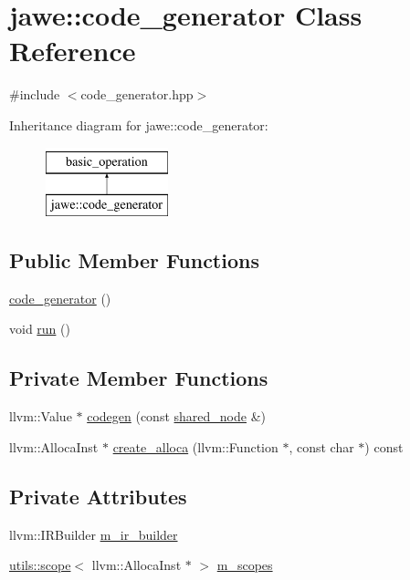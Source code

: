 \hypertarget{classjawe_1_1code__generator}{}\section{jawe\+:\+:code\+\_\+generator Class Reference}
\label{classjawe_1_1code__generator}


{\ttfamily \#include $<$code\+\_\+generator.\+hpp$>$}

Inheritance diagram for jawe\+:\+:code\+\_\+generator\+:\begin{figure}[H]
\begin{center}
\leavevmode
\includegraphics[height=2.000000cm]{classjawe_1_1code__generator}
\end{center}
\end{figure}
\subsection*{Public Member Functions}
\begin{DoxyCompactItemize}
\item 
\hyperlink{classjawe_1_1code__generator_a1218452973234e90972be154fc25bf92}{code\+\_\+generator} ()
\item 
void \hyperlink{classjawe_1_1code__generator_af280f3dcaeb6cbbf30b5e9eb55771b21}{run} ()
\end{DoxyCompactItemize}
\subsection*{Private Member Functions}
\begin{DoxyCompactItemize}
\item 
llvm\+::\+Value $\ast$ \hyperlink{classjawe_1_1code__generator_a88b1f6fff308ef1b6c3b63d211a457f3}{codegen} (const \hyperlink{namespacejawe_a3f307481d921b6cbb50cc8511fc2b544}{shared\+\_\+node} \&)
\item 
llvm\+::\+Alloca\+Inst $\ast$ \hyperlink{classjawe_1_1code__generator_a508a01a4a5d0c53070d3186640ccb8c5}{create\+\_\+alloca} (llvm\+::\+Function $\ast$, const char $\ast$) const
\end{DoxyCompactItemize}
\subsection*{Private Attributes}
\begin{DoxyCompactItemize}
\item 
llvm\+::\+I\+R\+Builder \hyperlink{classjawe_1_1code__generator_aad2f012dfc4d811c02e4e580d4fd3390}{m\+\_\+ir\+\_\+builder}
\item 
\hyperlink{classjawe_1_1utils_1_1scope}{utils\+::scope}$<$ llvm\+::\+Alloca\+Inst $\ast$ $>$ \hyperlink{classjawe_1_1code__generator_a209dd65e5b96fd20ea63fdb13f17b052}{m\+\_\+scopes}
\end{DoxyCompactItemize}


